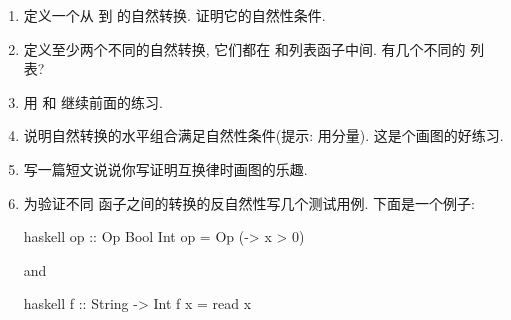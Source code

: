 \begin{enumerate}
  \tightlist
  \item
        定义一个从  到  的自然转换. 证明它的自然性条件.
  \item
        定义至少两个不同的自然转换, 它们都在  和列表函子中间.
        有几个不同的 \code{()} 列表?
  \item
        用  和  继续前面的练习.
  \item
        说明自然转换的水平组合满足自然性条件(提示: 用分量). 这是个画图的好练习.
  \item
        写一篇短文说说你写证明互换律时画图的乐趣.
  \item
        为验证不同  函子之间的转换的反自然性写几个测试用例. 下面是一个例子:

        \begin{snip}{haskell}
op :: Op Bool Int
op = Op (\x -> x > 0)
\end{snip}
        and

        \begin{snip}{haskell}
f :: String -> Int
f x = read x
\end{snip}
\end{enumerate}
